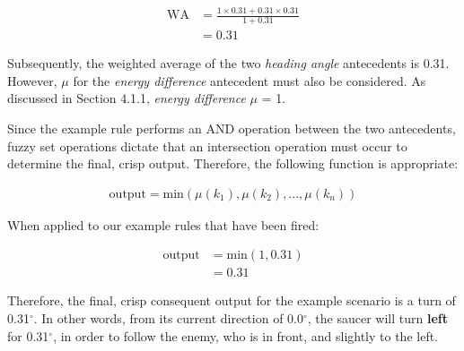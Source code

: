 {\LARGE
	\begin{align}
	\mbox{WA} &= \frac{1 \times 0.31 + 0.31 \times 0.31}{1 + 0.31} \\
	&= 0.31
	\end{align}
}

\noindent
Subsequently, the weighted average of the two \emph{heading angle} antecedents is 0.31. However, $\mu$ for the \emph{energy difference} antecedent must also be considered. As discussed in Section 4.1.1, \emph{energy difference} $\mu$ = 1.

Since the example rule performs an AND operation between the two antecedents, fuzzy set operations dictate that an intersection operation must occur to determine the final, crisp output. Therefore, the following function is appropriate:

{\LARGE
	\begin{align}
	\mbox{output} = \mbox{min}(\mu(k_1), \mu(k_2), \mbox{...}, \mu(k_n))
	\end{align}
}

\noindent
When applied to our example rules that have been fired:

{\LARGE
	\begin{align}
	\mbox{output} &= \mbox{min}(1, 0.31) \\
	&= 0.31
	\end{align}
}

\noindent
Therefore, the final, crisp consequent output for the example scenario is a turn of 0.31$^{\circ}$. In other words, from its current direction of 0.0$^{\circ}$, the saucer will turn \textbf{left} for 0.31$^{\circ}$, in order to follow the enemy, who is in front, and slightly to the left.